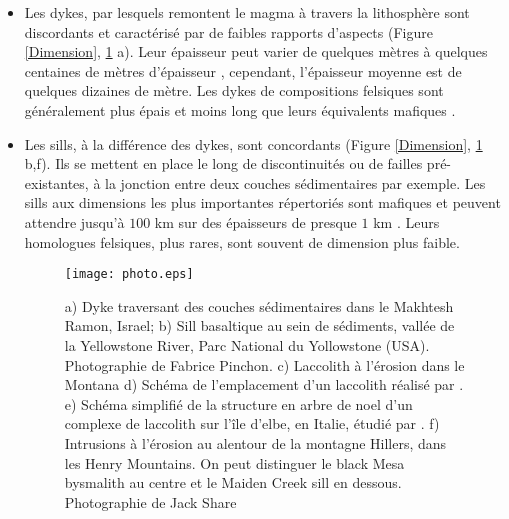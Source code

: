 \begin{itemize}
\item  Les  dykes,  par  lesquels  remontent le  magma  à  travers  la
  lithosphère sont discordants et  caractérisé par de faibles rapports
  d'aspects (Figure \ref{Dimension}, \ref{picture} a).  Leur épaisseur
  peut  varier  de quelques  mètres  à  quelques centaines  de  mètres
  d'épaisseur      \citep{Walker:1989jq,Rubin:1995upa},     cependant,
  l'épaisseur moyenne est de quelques  dizaines de mètre. Les dykes de
  compositions felsiques  sont généralement  plus épais et  moins long
  que leurs équivalents mafiques \citep{Rubin:1995upa}.

\item Les sills,  à la différence des dykes,  sont concordants (Figure
  \ref{Dimension},  \ref{picture} b,f).   Ils se  mettent en  place le
  long de discontinuités  ou de failles pré-existantes,  à la jonction
  entre  deux  couches  sédimentaires  par  exemple.   Les  sills  aux
  dimensions les plus importantes répertoriés sont mafiques et peuvent
  attendre  jusqu'à $100$  km sur  des  épaisseurs de  presque $1$  km
  \citep{Cruden:tg}.   Leurs homologues  felsiques,  plus rares,  sont
  souvent de dimension plus faible.

  \begin{figure}[htpb]
    \begin{center}
      \graphicspath{ {/Users/thorey/Documents/These/Manuscript/Figure/Chapter1/} }
      \texttt{[image: photo.eps]}
      \caption{a) Dyke  traversant des  couches sédimentaires  dans le
        Makhtesh  Ramon,  Israel;  b)   Sill  basaltique  au  sein  de
        sédiments, vallée  de la  Yellowstone River, Parc  National du
        Yollowstone  (USA).   Photographie  de  Fabrice  Pinchon.   c)
        Laccolith   à  l'érosion   dans  le   Montana  d)   Schéma  de
        l'emplacement       d'un      laccolith       réalisé      par
        \citet{Gilbert:1877uk}. e) Schéma simplifié de la structure en
        arbre de noel d'un complexe  de laccolith sur l'île d'elbe, en
        Italie,  étudié par  \citet{Rocchi:2010dn}.   f) Intrusions  à
        l'érosion au alentour  de la montagne Hillers,  dans les Henry
        Mountains.   On peut  distinguer  le black  Mesa bysmalith  au
        centre et  le Maiden Creek  sill en dessous.   Photographie de
        Jack Share}
      \label{picture}
    \end{center}
  \end{figure}


\end{itemize}
